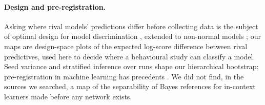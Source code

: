 \paragraph{Design and pre-registration.} Asking where rival models' predictions differ before collecting data is the subject
of optimal design for model discrimination \citep{boxhill1967,atkinson1975}, extended to non-normal models
\citep{lopezfidalgo2007}; our maps are design-space plots of the expected log-score difference between rival predictives,
used here to decide where a behavioural study can classify a model. Seed variance and stratified inference over runs
\citep{agarwal2021,sellam2022} shape our hierarchical bootstrap; pre-registration in machine learning has precedents
\citep{bertinetto2021}. We did not find, in the sources we searched, a map of the separability of Bayes references for
in-context learners made before any network exists.
